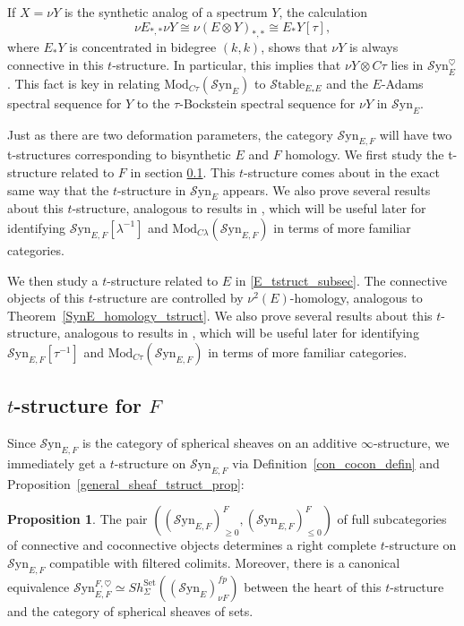 \documentclass[10pt]{amsart}
\theoremstyle{definition}
\numberwithin{figure}{section}
\numberwithin{equation}{section}
\newtheorem{proposition}[figure]{Proposition}
\theoremstyle{cited}
\newcommand{\Mod}{\mathrm{Mod}}
\newcommand{\Syn}{\mathcal{S}\mathrm{yn}}
\newcommand{\Stable}{\mathcal{S}\mathrm{table}}
\begin{document}
If $X=\nu Y$ is the synthetic analog of a spectrum $Y$, the calculation
$$
\nu E_{*,*}\nu Y\cong \nu (E\otimes Y)_{*,*}\cong E_*Y[\tau],
$$
where $E_*Y$ is concentrated in bidegree $(k,k)$, shows that $\nu Y$ is always connective in this $t$-structure. In particular, this implies that $\nu Y\otimes C\tau$ lies in $\Syn_E^\heartsuit$. This fact is key in relating $\Mod_{C\tau}(\Syn_E)$ to $\Stable_{E_*E}$ and the $E$-Adams spectral sequence for $Y$ to the $\tau$-Bockstein spectral sequence for $\nu Y$ in $\Syn_E$.

\bigskip

Just as there are two deformation parameters, the category $\Syn_{E,F}$ will have two t-structures corresponding to bisynthetic $E$ and $F$ homology. We first study the t-structure related to $F$ in section \ref{F_tstruct_subsec}. This $t$-structure comes about in the exact same way that the $t$-structure in $\Syn_E$ appears. We also prove several results about this $t$-structure, analogous to results in \cite{Pst22}, which will be useful later for identifying $\Syn_{E,F}[\lambda^{-1}]$ and $\Mod_{C\lambda}(\Syn_{E,F})$ in terms of more familiar categories.

\bigskip

We then study a $t$-structure related to $E$ in \ref{E_tstruct_subsec}. The connective objects of this $t$-structure are controlled by $\nu^2(E)$-homology, analogous to Theorem~\ref{SynE_homology_tstruct}. We also prove several results about this $t$-structure, analogous to results in \cite{Pst22}, which will be useful later for identifying $\Syn_{E,F}[\tau^{-1}]$ and $\Mod_{C\tau}(\Syn_{E,F})$ in terms of more familiar categories.

\subsection{$t$-structure for $F$}
\label{F_tstruct_subsec}

Since $\Syn_{E,F}$ is the category of spherical sheaves on an additive $\infty$-structure, we immediately get a $t$-structure on $\Syn_{E,F}$ via Definition~\ref{con_cocon_defin} and Proposition~\ref{general_sheaf_tstruct_prop}:

\begin{proposition}
\label{F_bisyn_tstruct_prop}
The pair $((\Syn_{E,F})_{\geq 0}^F,(\Syn_{E,F})_{\leq 0}^F)$ of full subcategories of connective and coconnective objects determines a right
complete $t$-structure on $\Syn_{E,F}$ compatible with filtered colimits. Moreover, there is a canonical equivalence $\Syn_{E,F}^{F,\heartsuit}\simeq Sh_{\Sigma}^{\mathrm{Set}}((\Syn_E)_{\nu F}^{fp})$ between the heart of this $t$-structure and the category of
spherical sheaves of sets.  
\end{proposition}
\end{document}
